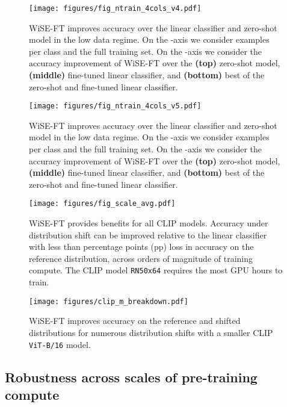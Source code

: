 \begin{figure*}
    \centering
    \texttt{[image: figures/fig\_ntrain\_4cols\_v4.pdf]}
    \caption{WiSE-FT improves accuracy over the linear classifier and zero-shot model in the low data regime. On the -axis we consider  examples per class and the full training set. On the -axis we consider the accuracy improvement of WiSE-FT over the \textbf{(top)} zero-shot model, \textbf{(middle)} fine-tuned linear classifier, and \textbf{(bottom)} best of the zero-shot and fine-tuned linear classifier.}
    \label{fig:figntrain}
\end{figure*}

\begin{figure*}
    \centering
    \texttt{[image: figures/fig\_ntrain\_4cols\_v5.pdf]}
    \caption{WiSE-FT improves accuracy over the linear classifier and zero-shot model in the low data regime. On the -axis we consider  examples per class and the full training set. On the -axis we consider the accuracy improvement of WiSE-FT over the \textbf{(top)} zero-shot model, \textbf{(middle)} fine-tuned linear classifier, and \textbf{(bottom)} best of the zero-shot and fine-tuned linear classifier.}
    \label{fig:figntrainv2}
\end{figure*}

\FloatBarrier
\clearpage

\begin{figure}[h]
    \centering
    \texttt{[image: figures/fig\_scale\_avg.pdf]}
    \caption{WiSE-FT provides benefits for all CLIP models. Accuracy under distribution shift can be improved relative to the linear classifier with less than  percentage points (pp) loss in accuracy on the reference distribution, across orders of magnitude of training compute. The CLIP model \texttt{RN50x64} requires the most GPU hours to train.}
    \label{fig:fig_scale}
    
\end{figure}



\begin{figure}[h]
    \centering
    \texttt{[image: figures/clip\_m\_breakdown.pdf]}
    \caption{WiSE-FT improves accuracy on the reference and shifted distributions for numerous distribution shifts with a smaller CLIP \texttt{ViT-B/16} model.}
    \label{fig:b16}
\end{figure}


\subsection{Robustness across scales of pre-training compute}
\label{sec:scaling}

